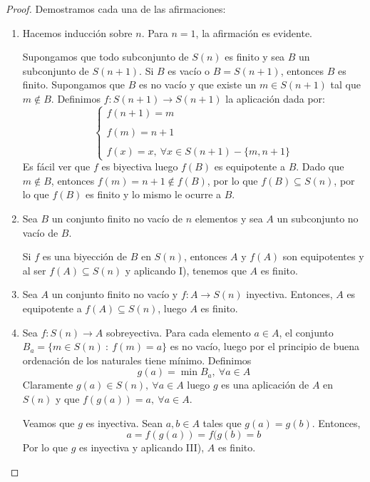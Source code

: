 \begin{proof} Demostramos cada una de las afirmaciones:
    \begin{enumerate}
        \item Hacemos inducción sobre $n$. Para $n=1$, la afirmación es evidente.
        
        Supongamos que todo subconjunto de $S(n)$ es finito y sea $B$ un subconjunto de $S(n+1)$. Si $B$ es vacío o $B = S(n+1)$,
        entonces $B$ es finito. Supongamos que $B$ es no vacío y que existe un $m \in S(n+1)$ tal que $m \notin B$.
        Definimos $f: S(n+1) \longrightarrow S(n+1)$ la aplicación dada por:
        \begin{equation*}
            \left\{ \begin{array}{lcc}
                f(n+1)=m \\ \\
                f(m)=n+1 \\ \\
                f(x)=x,~\forall x \in S(n+1)-\{m,n+1\}
                \end{array}
            \right.
        \end{equation*}
        Es fácil ver que $f$ es biyectiva luego $f(B)$ es equipotente a $B$. Dado que $m \notin B$, entonces $f(m)=n+1 \notin f(B)$,
        por lo que $f(B) \subseteq S(n)$, por lo que $f(B)$ es finito y lo mismo le ocurre a $B$.

        \item Sea $B$ un conjunto finito no vacío de $n$ elementos y sea $A$ un subconjunto no vacío de $B$.
        
        Si $f$ es una biyección de $B$ en $S(n)$, entonces $A$ y $f(A)$ son equipotentes y al ser $f(A) \subseteq S(n)$
        y aplicando I), tenemos que $A$ es finito.

        \item Sea $A$ un conjunto finito no vacío y $f:A \longrightarrow S(n)$ inyectiva. Entonces, $A$ es equipotente a $f(A) \subseteq S(n)$, luego $A$ es finito.

        \item Sea $f:S(n) \longrightarrow A$ sobreyectiva. Para cada elemento $a \in A$, el conjunto $B_a = \{m \in S(n)~:~ f(m)=a\}$ es no vacío, luego por el principio de buena ordenación de los naturales tiene mínimo. Definimos
        \begin{equation*}
            g(a) = \min B_a,~\forall a \in A
        \end{equation*}
        Claramente $g(a) \in S(n),~\forall a \in A$ luego $g$ es una aplicación de $A$ en $S(n)$ y que $f(g(a))=a,~\forall a \in A$.
        
        Veamos que $g$ es inyectiva. Sean $a,b \in A$ tales que $g(a)=g(b)$. Entonces,
        \begin{equation*}
            a=f(g(a))=f(g(b)=b
        \end{equation*}
        Por lo que $g$ es inyectiva y aplicando III), $A$ es finito.
    \end{enumerate}
\end{proof}

